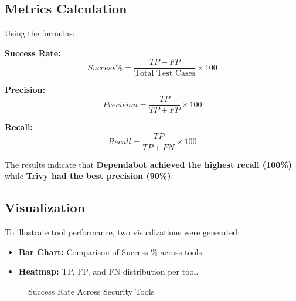\documentclass[conference]{IEEEtran}
\begin{document}
\subsection{Metrics Calculation}

Using the formulas:

\textbf{Success Rate:}
\begin{equation}
    Success \% = \frac{TP - FP}{\text{Total Test Cases}} \times 100
\end{equation}

\textbf{Precision:}
\begin{equation}
    Precision = \frac{TP}{TP + FP} \times 100
\end{equation}

\textbf{Recall:}
\begin{equation}
    Recall = \frac{TP}{TP + FN} \times 100
\end{equation}

The results indicate that \textbf{Dependabot achieved the highest recall (100\%)} while \textbf{Trivy had the best precision (90\%)}.

\subsection{Visualization}

To illustrate tool performance, two visualizations were generated:

\begin{itemize}
    \item \textbf{Bar Chart:} Comparison of Success \% across tools.
    \item \textbf{Heatmap:} TP, FP, and FN distribution per tool.
\end{itemize}

\begin{figure}[h]
    \centering
    \caption{Success Rate Across Security Tools}
    \label{fig:success_rate}
\end{figure}
\end{document}
